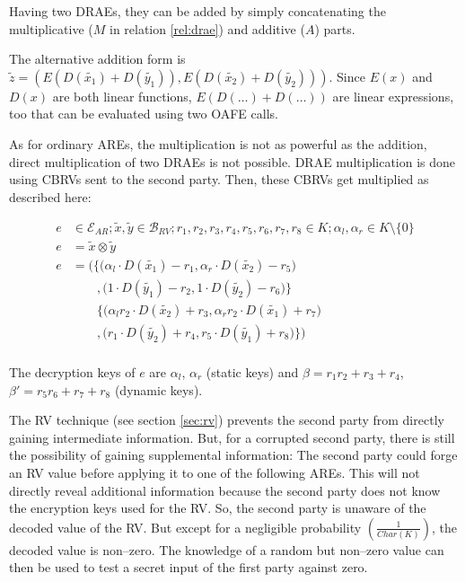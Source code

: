 Having two DRAEs, they can be added by simply concatenating the multiplicative
($M$ in relation \ref{rel:drae}) and additive ($A$) parts.



The alternative addition form is
$\widetilde{z} =
\left( E\left(D(\widetilde{x_1}) + D(\widetilde{y_1})\right),
       E\left(D(\widetilde{x_2}) + D(\widetilde{y_2})\right)
\right)$.
Since $E(x)$ and $D(x)$ are both linear functions,
$E\left(D(\ldots) +D(\ldots)\right)$
are linear expressions, too that can be evaluated using two OAFE calls.



As for ordinary AREs, the multiplication is not as powerful as the addition,
direct multiplication of two DRAEs is not possible. DRAE multiplication is
done using CBRVs sent to the second party. Then, these CBRVs get multiplied as
described here:

\begin{align*}
  e & \in \mathcal{E}_{AR}; \widetilde{x}, \widetilde{y} \in \mathcal{B}_{RV};
  r_1, r_2, r_3, r_4, r_5, r_6, r_7, r_8 \in K;
  \alpha_l, \alpha_r \in K \setminus \{0\} \\
  e & = \widetilde{x} \otimes \widetilde{y} \\
  e & = \Bigg(\Big\{\big( \alpha_l \cdot D(\widetilde{x_1}) - r_1,
                          \alpha_r \cdot D(\widetilde{x_2}) -r_5 \big) \\
    &\qquad ,     \big(   1        \cdot D(\widetilde{y_1}) - r_2,
                          1        \cdot D(\widetilde{y_2}) - r_6 \big) \Big\}\\
    &\qquad   \Big\{\big( \alpha_lr_2 \cdot D(\widetilde{x_2}) + r_3,
                          \alpha_rr_2 \cdot D(\widetilde{x_1}) + r_7 \big) \\
    &\qquad ,       \big ( r_1        \cdot D(\widetilde{y_2}) + r_4,
                           r_5        \cdot D(\widetilde{y_1}) + r_8 \big)
              \Big\}\Bigg) \\
\end{align*}

The decryption keys of $e$ are $\alpha_l$, $\alpha_r$ (static keys) and
$\beta = r_1r_2 + r_3 + r_4$, $\beta' = r_5r_6 + r_7 + r_8$ (dynamic keys).

\label{sec:cbrv}

The RV technique (see section \ref{sec:rv}) prevents the
second party from directly gaining intermediate information. But, for a
corrupted second party, there is still the possibility of gaining supplemental
information: The second party could forge an RV value before applying it to one
of the following AREs. This will not directly reveal additional information
because the second party does not know the encryption keys used for the RV. So,
the second party is unaware of the decoded value of the RV. But except for a
negligible probability $\left(\frac{1}{Char(K)}\right)$, the decoded value is
non--zero.  The knowledge of a random but non--zero value can then be used to
test a secret input of the first party against zero. 

